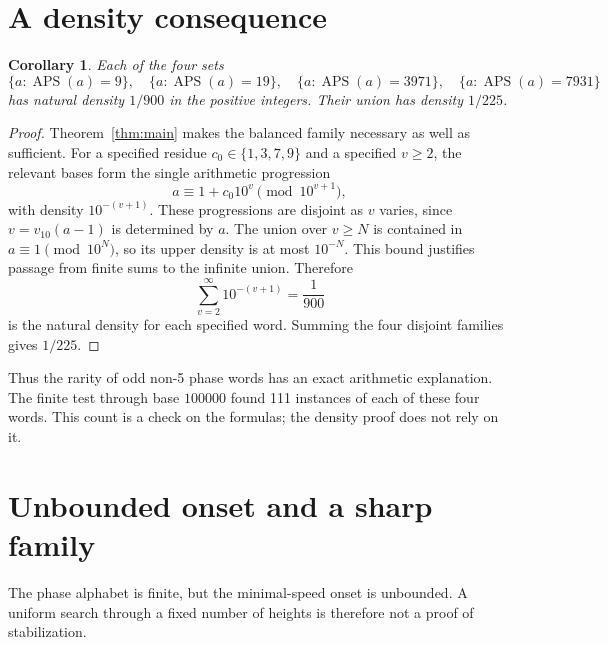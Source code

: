 \documentclass[11pt,letterpaper]{article}
\numberwithin{equation}{section}
\newtheorem{corollary}[theorem]{Corollary}
\theoremstyle{definition}
\newcommand{\APS}{\operatorname{APS}}
\begin{document}
\section{A density consequence}
\begin{corollary}\label{cor:density}
Each of the four sets
\[
 \{a:\APS(a)=9\},\quad \{a:\APS(a)=19\},\quad
 \{a:\APS(a)=3971\},\quad\{a:\APS(a)=7931\}
\]
has natural density $1/900$ in the positive integers. Their union has density
$1/225$.
\end{corollary}
\begin{proof}
Theorem~\ref{thm:main} makes the balanced family necessary as well as
sufficient. For a specified residue $c_0\in\{1,3,7,9\}$ and a specified
$v\geq2$, the relevant bases form the single arithmetic progression
\[
 a\equiv1+c_0 10^v\pmod {10^{v+1}},
\]
with density $10^{-(v+1)}$. These progressions are disjoint as $v$ varies,
since $v=v_{10}(a-1)$ is determined by $a$. The union over $v\geq N$ is
contained in $a\equiv1\pmod{10^N}$, so its upper density is at most $10^{-N}$.
This bound justifies passage from finite sums to the infinite union. Therefore
\[
 \sum_{v=2}^\infty10^{-(v+1)}=\frac{1}{900}
\]
is the natural density for each specified word. Summing the four disjoint
families gives $1/225$.
\end{proof}

Thus the rarity of odd non-5 phase words has an exact arithmetic explanation.
The finite test through base $100000$ found 111 instances of each of these
four words. This count is a check on the formulas; the density proof does not
rely on it.

\section{Unbounded onset and a sharp family}\label{sec:sharp}
The phase alphabet is finite, but the minimal-speed onset is unbounded. A
uniform search through a fixed number of heights is therefore not a proof of
stabilization.
\end{document}
